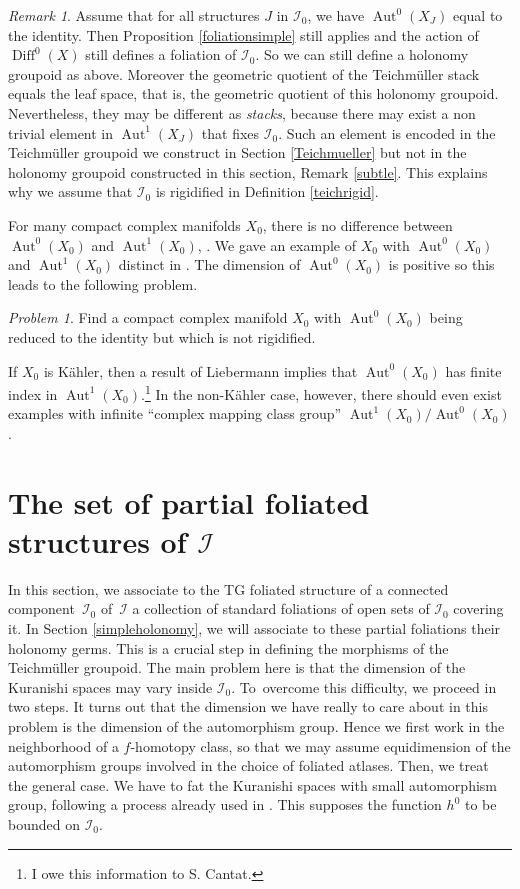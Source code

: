 \documentclass[JEP,XML,SOM,Unicode]{cedram}
\let\mathcal\mathscr
\DeclareMathOperator{\Aut}{Aut}
\DeclareMathOperator{\Diff}{Diff}
\theoremstyle{plain}
\theoremstyle{definition}
\theoremstyle{remark}
\newtheorem{remark}[theorem]{Remark}
\newtheorem{problem}[theorem]{Problem}
\numberwithin{equation}{section}
\newcommand{\Azero}{\Aut^0(X_0)}
\newcommand{\Aun}{\Aut^1(X_0)}
\newcommand{\cI}{\mathcal{I}}
\begin{document}
\begin{remark}
\label{Aut10bis}
Assume that for all structures $J$ in $\cI_0$, we have $\Aut^0(X_J)$ equal to the identity. Then Proposition \ref{foliationsimple} still applies and the action of $\Diff^0(X)$ still defines a foliation of $\cI_0$. So we can still define a holonomy groupoid as above. Moreover the geometric quotient of the Teichmüller stack equals the leaf space, that is, the geometric quotient of this holonomy groupoid. Nevertheless, they may be different as \emph{stacks}, because there may exist a non trivial element in $\Aut^1(X_J)$ that fixes $\cI_0$. Such an element is encoded in the Teichmüller groupoid we construct in Section \ref{Teichmueller} but not in the holonomy groupoid constructed in this section, \cf Remark \ref{subtle}. This explains why we assume that $\cI_0$ is rigidified in Definition \ref{teichrigid}.

For many compact complex manifolds $X_0$, there is no difference between $\Aut^0(X_0)$ and $\Aut^1(X_0)$, \cf \cite{Catsurvey}. We gave an example of $X_0$ with $\Azero$ and $\Aun$ distinct in \cite{Aut1paper}. The dimension of $\Azero$ is positive so this leads to the following problem.

\begin{problem}
Find a compact complex manifold $X_0$ with $\Aut^0(X_0)$ being reduced to the identity but which is not rigidified.
\end{problem}

If $X_0$ is Kähler, then a result of Liebermann implies that $\Aut^0(X_0)$ has finite index in $\Aut^1(X_0)$.\footnote{I owe this information to S. Cantat.} In the non-Kähler case, however, there should even exist examples with infinite ``complex mapping class group'' $\Aut^1(X_0)/\Aut^0(X_0)$.
\end{remark}

\section{The set of partial foliated structures of \texorpdfstring{$\cI$}{I}}
\label{multifoliate}

In this section, we associate to the TG foliated structure of a connected component~$\cI_0$ of~$\cI$ a collection of standard foliations of open sets of $\cI_0$ covering it. In Section \ref{simpleholonomy}, we will associate to these partial foliations their holonomy germs. This is a crucial step in defining the morphisms of the Teichmüller groupoid. The main problem here is that the dimension of the Kuranishi spaces may vary inside $\cI_0$. To~overcome this difficulty, we proceed in two steps. It turns out that the dimension we have really to care about in this problem is the dimension of the automorphism group. Hence we first work in the neighborhood of a $f$-homotopy class, so that we may assume equidimension of the automorphism groups involved in the choice of foliated atlases. Then, we treat the general case. We have to fat the Kuranishi spaces with small automorphism group, following a process already used in \cite{circle}. This supposes the function $h^0$ to be bounded on $\cI_0$.
\end{document}
